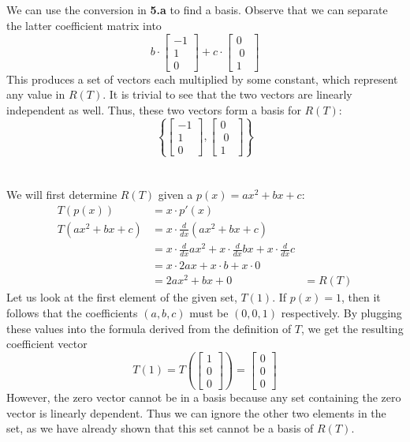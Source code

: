 \documentclass[]{article}
\newcommand{\bmat}[1]{\begin{bmatrix}#1\end{bmatrix}}
\begin{document}
\subsection{}
We can use the conversion in \textbf{5.a} to find a basis. Observe that we can separate the latter coefficient matrix into
\[ b \cdot \bmat{-1\\1\\0} + c \cdot \bmat{0\\\;0\;\\1} \]
This produces a set of vectors each multiplied by some constant, which represent any value in $R(T)$. It is trivial to see that the two vectors are linearly independent as well. Thus, these two vectors form a basis for $R(T)$:
\[ \left\{ \bmat{-1\\1\\0},\bmat{0\\\;0\;\\1} \right\} \]

\section{}
We will first determine $R(T)$ given a $p(x) = ax^2 + bx + c$:
\begin{align*}
	T(p(x)) &= x \cdot p'(x)\\
	T(ax^2 + bx + c) &= x \cdot \frac{d}{dx}(ax^2 + bx + c)\\
	&= x \cdot \frac{d}{dx}ax^2 + x \cdot \frac{d}{dx}bx + x \cdot \frac{d}{dx}c\\
	&= x \cdot 2ax + x \cdot b + x \cdot 0\\
	&= 2ax^2 + bx + 0
	&= R(T)
\end{align*}
Let us look at the first element of the given set, $T(1)$. If $p(x) = 1$, then it follows that the coefficients $(a,b,c)$ must be $(0, 0, 1)$ respectively. By plugging these values into the formula derived from the definition of $T$, we get the resulting coefficient vector
\[ T(1) = T\left(\bmat{1\\0\\0}\right) = \bmat{0\\0\\0}\]
However, the zero vector cannot be in a basis because any set containing the zero vector is linearly dependent. Thus we can ignore the other two elements in the set, as we have already shown that this set cannot be a basis of $R(T)$.
\end{document}
